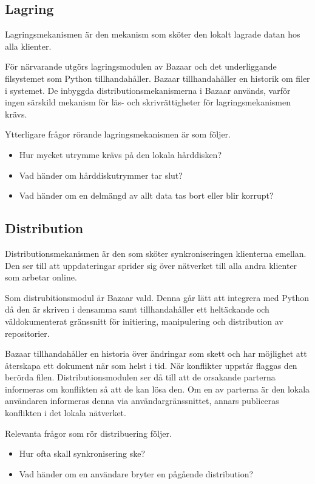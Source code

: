 \subsection{Lagring}
Lagringsmekanismen är den mekanism som sköter den lokalt lagrade datan
hos alla klienter.

För närvarande utgörs lagringsmodulen av Bazaar och det underliggande
filsystemet som Python tillhandahåller. Bazaar tillhandahåller en
historik om filer i systemet. De inbyggda distributionsmekanismerna i
Bazaar används, varför ingen särskild mekanism för läs- och
skrivrättigheter för lagringsmekanismen krävs.

Ytterligare frågor rörande lagringsmekanismen är som följer.
\begin{itemize}
\item Hur mycket utrymme krävs på den lokala hårddisken?
\item Vad händer om hårddiskutrymmer tar slut?
\item Vad händer om en delmängd av allt data tas bort eller blir korrupt?
\end{itemize}
\subsection{Distribution}
Distributionsmekanismen är den som sköter synkroniseringen klienterna
emellan. Den ser till att uppdateringar sprider sig över nätverket
till alla andra klienter som arbetar online.

Som distrubitionsmodul är Bazaar vald. Denna går lätt att integrera
med Python då den är skriven i densamma samt tillhandahåller ett
heltäckande och väldokumenterat gränssnitt för initiering,
manipulering och distribution av repositorier.

Bazaar tillhandahåller en historia över ändringar som skett och har
möjlighet att återskapa ett dokument när som helst i tid. När
konflikter uppstår flaggas den berörda filen. Distributionsmodulen ser
då till att de orsakande parterna informeras om konflikten så att de
kan lösa den. Om en av parterna är den lokala användaren informeras
denna via användargränssnittet, annars publiceras konflikten i det
lokala nätverket.

Relevanta frågor som rör distribuering följer.
\begin{itemize}
\item Hur ofta skall synkronisering ske?
\item Vad händer om en användare bryter en pågående distribution?
\end{itemize}
